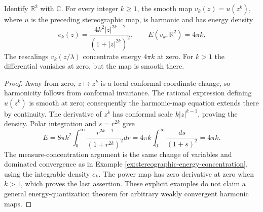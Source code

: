 \begin{example}\label{ex:higher-degree-spherical-bubble}
Identify $\mathbb R^2$ with $\mathbb C$. For every integer $k\ge1$, the smooth map $v_k(z)=u(z^k)$, where $u$ is the preceding stereographic map, is harmonic and has energy density
\[
 e_k(z)=\frac{4k^2|z|^{2k-2}}{(1+|z|^{2k})^2},\qquad
 E(v_k;\mathbb R^2)=4\pi k.
\]
The rescalings $v_k(z/\lambda)$ concentrate energy $4\pi k$ at zero. For $k>1$ the differential vanishes at zero, but the map is smooth there.
\end{example}
\begin{proof}
Away from zero, $z\mapsto z^k$ is a local conformal coordinate change, so harmonicity follows from conformal invariance. The rational expression defining $u(z^k)$ is smooth at zero; consequently the harmonic-map equation extends there by continuity. The derivative of $z^k$ has conformal scale $k|z|^{k-1}$, proving the density. Polar integration and $s=r^{2k}$ give
\[
 E=8\pi k^2\int_0^\infty\frac{r^{2k-1}}{(1+r^{2k})^2}dr
 =4\pi k\int_0^\infty\frac{ds}{(1+s)^2}=4\pi k.
\]
The measure-concentration argument is the same change of variables and dominated convergence as in Example \ref{ex:stereographic-energy-concentration}, using the integrable density $e_k$. The power map has zero derivative at zero when $k>1$, which proves the last assertion. These explicit examples do not claim a general energy-quantization theorem for arbitrary weakly convergent harmonic maps.
\end{proof}

